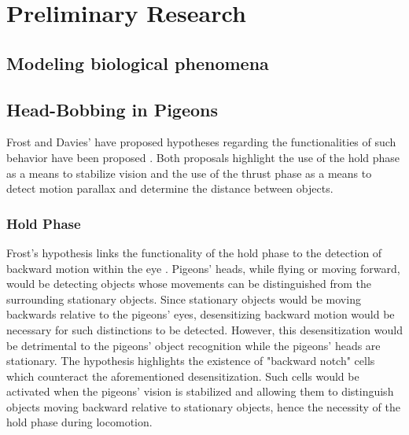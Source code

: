 \chapter{Preliminary Research}
\section{Modeling biological phenomena}

\section{Head-Bobbing in Pigeons}

  Frost and Davies' have proposed hypotheses regarding the functionalities of such behavior have been proposed \cite{frost1978optokinetic} \cite{davies1988head}. Both proposals highlight the use of the hold phase as a means to stabilize vision and the use of the thrust phase as a means to detect motion parallax and determine the distance between objects.

\subsection{Hold Phase}
  Frost's hypothesis links the functionality of the hold phase to the detection of backward motion within the eye \cite{frost1978optokinetic}. Pigeons' heads, while flying or moving forward, would be detecting objects whose movements can be distinguished from the surrounding stationary objects. Since stationary objects would be moving backwards relative to the pigeons' eyes, desensitizing backward motion would be necessary for such distinctions to be detected. However, this desensitization would be detrimental to the pigeons' object recognition while the pigeons' heads are stationary. The hypothesis highlights the existence of "backward notch" cells which counteract the aforementioned desensitization. Such cells would be activated when the pigeons' vision is stabilized and allowing them to distinguish objects moving backward relative to stationary objects, hence the necessity of the hold phase during locomotion.

